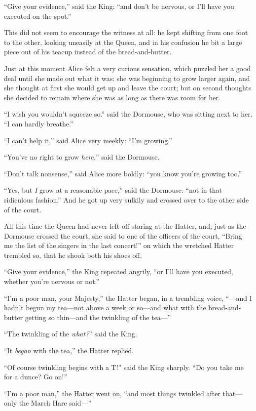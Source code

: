\documentclass[book, 20pt]{extbook}
\begin{document}
``Give your evidence,'' said the King; ``and don't be nervous, or I'll
have you executed on the spot.''

This did not seem to encourage the witness at all: he kept shifting from
one foot to the other, looking uneasily at the Queen, and in his
confusion he bit a large piece out of his teacup instead of the
bread-and-butter.

Just at this moment Alice felt a very curious sensation, which puzzled
her a good deal until she made out what it was: she was beginning to
grow larger again, and she thought at first she would get up and leave
the court; but on second thoughts she decided to remain where she was as
long as there was room for her.

``I wish you wouldn't squeeze so.'' said the Dormouse, who was sitting
next to her. ``I can hardly breathe.''

``I can't help it,'' said Alice very meekly: ``I'm growing.''

``You've no right to grow \emph{here},'' said the Dormouse.

``Don't talk nonsense,'' said Alice more boldly: ``you know you're
growing too.''

``Yes, but \emph{I} grow at a reasonable pace,'' said the Dormouse:
``not in that ridiculous fashion.'' And he got up very sulkily and
crossed over to the other side of the court.

All this time the Queen had never left off staring at the Hatter, and,
just as the Dormouse crossed the court, she said to one of the officers
of the court, ``Bring me the list of the singers in the last concert!''
on which the wretched Hatter trembled so, that he shook both his shoes
off.

``Give your evidence,'' the King repeated angrily, ``or I'll have you
executed, whether you're nervous or not.''

``I'm a poor man, your Majesty,'' the Hatter began, in a trembling
voice, ``---and I hadn't begun my tea---not above a week or so---and
what with the bread-and-butter getting so thin---and the twinkling of
the tea---''

``The twinkling of the \emph{what?}'' said the King.

``It \emph{began} with the tea,'' the Hatter replied.

``Of course twinkling begins with a T!'' said the King sharply. ``Do you
take me for a dunce? Go on!''

``I'm a poor man,'' the Hatter went on, ``and most things twinkled after
that---only the March Hare said---''
\end{document}
